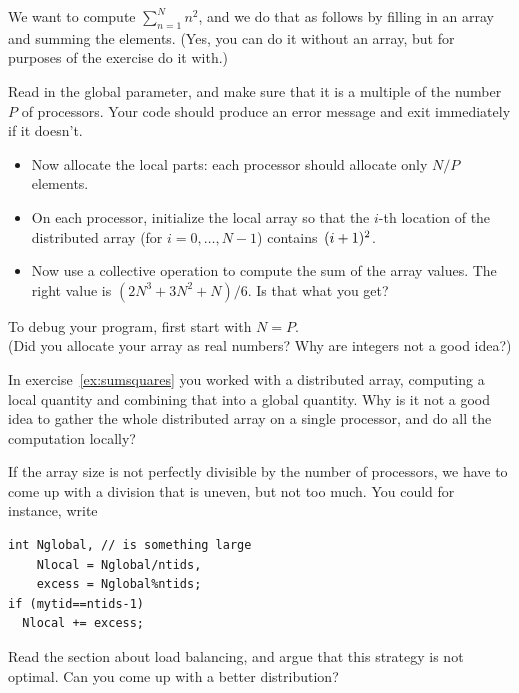 \begin{exercise}
  \label{ex:sumsquares}
  We want to compute $\sum_{n=1}^Nn^2$, and we do that as follows
  by filling in an array and summing the elements. (Yes, you can do it
  without an array, but for purposes of the exercise do it with.)

  Read in the global  parameter, and make sure that it is a multiple
  of the number $P$ of processors. Your code should produce an error message and
  exit immediately if it doesn't.

  \begin{itemize}
  \item Now allocate the local parts: each processor should allocate only $N/P$ elements.
  \item On each processor, initialize the local array
    so that the $i$-th location of the distributed array
    (for $i=0,\ldots,N-1$)
    contains~$(i+\nobreak 1)^2$.
  \item Now use a collective operation to compute the sum of the array values.
    The right value is $(2N^3+3N^2+N)/6$. Is that what you get?
  \end{itemize}
  To debug your program, first start with $N=P$.\\
  (Did you allocate your array as real numbers? Why are integers not a good idea?)
\end{exercise}

\begin{exercise}
  In exercise~\ref{ex:sumsquares} you worked with a distributed array,
  computing a local quantity and combining that into a global
  quantity.
  Why is it not a good idea to gather the whole distributed array on a
  single processor, and do all the computation locally?
\end{exercise}

If the array size is not perfectly divisible by the number of processors,
we have to come up with a division that is uneven, but not too much.
You could for instance, write
\begin{verbatim}
int Nglobal, // is something large
    Nlocal = Nglobal/ntids,
    excess = Nglobal%ntids;
if (mytid==ntids-1) 
  Nlocal += excess;
\end{verbatim}

\begin{exercise}
  Read the section  about load balancing, and argue that this strategy
  is not optimal. Can you come up with a better distribution?
\end{exercise}

